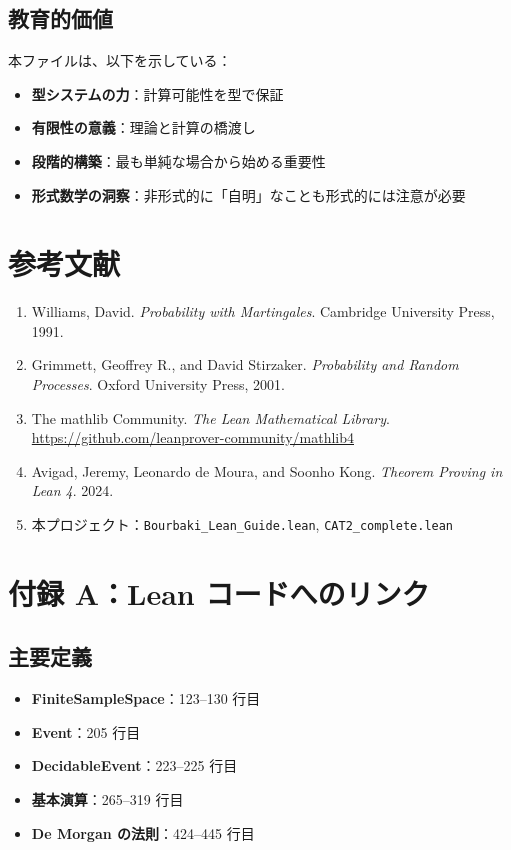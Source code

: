 \documentclass[12pt,a4paper,ja=standard]{bxjsarticle}
\theoremstyle{definition}
\begin{document}
\subsection{教育的価値}

本ファイルは、以下を示している：

\begin{itemize}
    \item \textbf{型システムの力}：計算可能性を型で保証
    \item \textbf{有限性の意義}：理論と計算の橋渡し
    \item \textbf{段階的構築}：最も単純な場合から始める重要性
    \item \textbf{形式数学の洞察}：非形式的に「自明」なことも形式的には注意が必要
\end{itemize}

\section*{参考文献}

\begin{enumerate}
    \item Williams, David. \textit{Probability with Martingales}. Cambridge University Press, 1991.
    \item Grimmett, Geoffrey R., and David Stirzaker. \textit{Probability and Random Processes}. Oxford University Press, 2001.
    \item The mathlib Community. \textit{The Lean Mathematical Library}. \url{https://github.com/leanprover-community/mathlib4}
    \item Avigad, Jeremy, Leonardo de Moura, and Soonho Kong. \textit{Theorem Proving in Lean 4}. 2024.
    \item 本プロジェクト：\texttt{Bourbaki\_Lean\_Guide.lean}, \texttt{CAT2\_complete.lean}
\end{enumerate}

\section*{付録 A：Lean コードへのリンク}

\subsection*{主要定義}

\begin{itemize}
    \item \textbf{FiniteSampleSpace}：123--130 行目
    \item \textbf{Event}：205 行目
    \item \textbf{DecidableEvent}：223--225 行目
    \item \textbf{基本演算}：265--319 行目
    \item \textbf{De Morgan の法則}：424--445 行目
\end{itemize}
\end{document}
